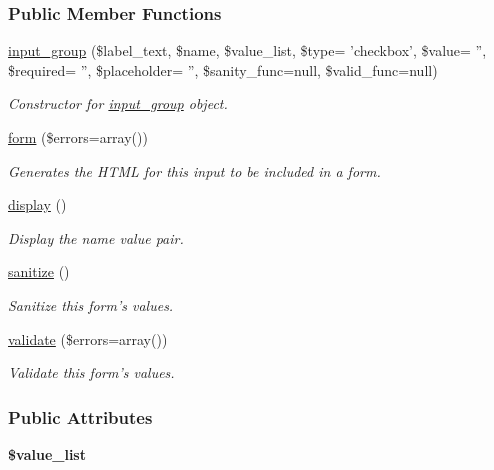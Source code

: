 \subsubsection*{Public Member Functions}
\begin{DoxyCompactItemize}
\item 
\hyperlink{classinput__group_aef532e921771fbfccacbdefba1db7dce}{input\-\_\-group} (\$label\-\_\-text, \$name, \$value\-\_\-list, \$type= 'checkbox', \$value= '', \$required= '', \$placeholder= '', \$sanity\-\_\-func=null, \$valid\-\_\-func=null)
\begin{DoxyCompactList}\small\item\em Constructor for \hyperlink{classinput__group}{input\-\_\-group} object. \end{DoxyCompactList}\item 
\hyperlink{classinput__group_a67f5d8e4ac86e75313e8d0d8696b7b35}{form} (\$errors=array())
\begin{DoxyCompactList}\small\item\em Generates the H\-T\-M\-L for this input to be included in a form. \end{DoxyCompactList}\item 
\hyperlink{classinput__group_a91e1b3cab54b81c21ab5f88a2f4f5c6a}{display} ()
\begin{DoxyCompactList}\small\item\em Display the name value pair. \end{DoxyCompactList}\item 
\hyperlink{classinput__group_a4f0f7f8aeb74550c99114f28dca449cb}{sanitize} ()
\begin{DoxyCompactList}\small\item\em Sanitize this form's values. \end{DoxyCompactList}\item 
\hyperlink{classinput__group_ae0461a6034effccc3ca6bf34b6539cdd}{validate} (\$errors=array())
\begin{DoxyCompactList}\small\item\em Validate this form's values. \end{DoxyCompactList}\end{DoxyCompactItemize}
\subsubsection*{Public Attributes}
\begin{DoxyCompactItemize}
\item 
\hypertarget{classinput__group_ae3e73495f83432370ed5acb0f81e1ba1}{{\bfseries \$value\-\_\-list}}\label{classinput__group_ae3e73495f83432370ed5acb0f81e1ba1}

\end{DoxyCompactItemize}



